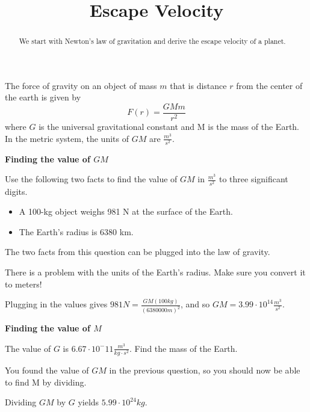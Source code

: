 \documentclass{ximera}
\title{Escape Velocity}
\begin{document}
\begin{abstract}
We start with Newton's law of gravitation and derive the escape velocity of a planet.
\end{abstract}
\maketitle

\begin{axiom}
The force of gravity on an object of mass $m$ that is distance $r$ from the center of the earth is given by
$$ F(r) = \frac{G M m}{r^2}$$
where $G$ is the universal gravitational constant and M is the mass of the Earth. In the metric system, the units of $G M$ are $\frac{m^3}{s^2}$.
\end{axiom}

\textbf{Finding the value of $GM$}

\begin{question}
Use the following two facts to find the value of $GM$ in $\frac{m^3}{s^2}$ to three significant digits. 
\begin{itemize}
\item A 100-kg object weighs 981 N at the surface of the Earth.
\item The Earth's radius is 6380 km.
\end{itemize}
\begin{solution}
\begin{multiple-choice}
\end{multiple-choice}
\begin{hint}
The two facts from this question can be plugged into the law of gravity.
\end{hint}
\begin{hint}
There is a problem with the units of the Earth's radius. Make sure you convert it to meters!
\end{hint}
Plugging in the values gives $981 N = \frac{GM (100 kg)}{(6380000 m)^2}$, and so $GM = 3.99 \cdot 10^{14} \frac{m^3}{s^2}$.
\end{solution}
\end{question}

\textbf{Finding the value of $M$}

\begin{question}
The value of $G$ is $6.67 \cdot 10^-{11} \frac{m^3}{kg \cdot s^2}$. Find the mass of the Earth.
\begin{solution}
\begin{multiple-choice}
\end{multiple-choice}
\begin{hint}
You found the value of $G M$ in the previous question, so you should now be able to find M by dividing.
\end{hint}
Dividing $G M$ by $G$ yields $5.99 \cdot 10^{24} kg$.
\end{solution}
\end{question}
\end{document}
